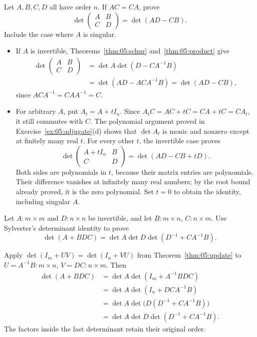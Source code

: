 \begin{problem}\label{ex:05:commuting-blocks}
Let \(A,B,C,D\) all have order \(n\). If \(AC=CA\), prove
\[
\det\begin{pmatrix}A&B\\C&D\end{pmatrix}=\det(AD-CB).
\]
Include the case where \(A\) is singular.
\end{problem}
\begin{solution}
\begin{itemize}
\item If \(A\) is invertible, Theorems~\ref{thm:05:schur} and~\ref{thm:05:product} give
\[
\begin{aligned}
\det\begin{pmatrix}A&B\\C&D\end{pmatrix}
&=\det A\det(D-CA^{-1}B)\\
&=\det(AD-ACA^{-1}B)=\det(AD-CB),
\end{aligned}
\]
since \(ACA^{-1}=CAA^{-1}=C\).
\item For arbitrary \(A\), put \(A_t=A+tI_n\). Since
\(A_tC=AC+tC=CA+tC=CA_t\), it still commutes with \(C\).
The polynomial argument proved in Exercise~\ref{ex:05:adjugate}(d) shows
that \(\det A_t\) is monic and nonzero except at finitely many real \(t\).
For every other \(t\), the invertible case proves
\[
\det\begin{pmatrix}A+tI_n&B\\C&D\end{pmatrix}
=\det(AD-CB+tD).
\]
Both sides are polynomials in \(t\), because their matrix entries are
polynomials. Their difference vanishes at infinitely many real numbers;
by the root bound already proved, it is the zero polynomial. Set \(t=0\)
to obtain the identity, including singular \(A\).
\end{itemize}
\end{solution}

\begin{problem}\label{ex:05:matrix-update}
Let \(A:m\times m\) and \(D:n\times n\) be invertible, and let
\(B:m\times n\), \(C:n\times m\). Use Sylvester's determinant identity
to prove
\[
\det(A+BDC)=\det A\det D\det(D^{-1}+CA^{-1}B).
\]
\end{problem}
\begin{solution}
Apply \(\det(I_m+UV)=\det(I_n+VU)\) from Theorem~\ref{thm:05:update} to
\(U=A^{-1}B:m\times n\), \(V=DC:n\times m\). Then
\[
\begin{aligned}
\det(A+BDC)
&=\det A\det(I_m+A^{-1}BDC)\\
&=\det A\det(I_n+DCA^{-1}B)\\
&=\det A\det\bigl(D(D^{-1}+CA^{-1}B)\bigr)\\
&=\det A\det D\det(D^{-1}+CA^{-1}B).
\end{aligned}
\]
The factors inside the last determinant retain their original order.
\end{solution}

